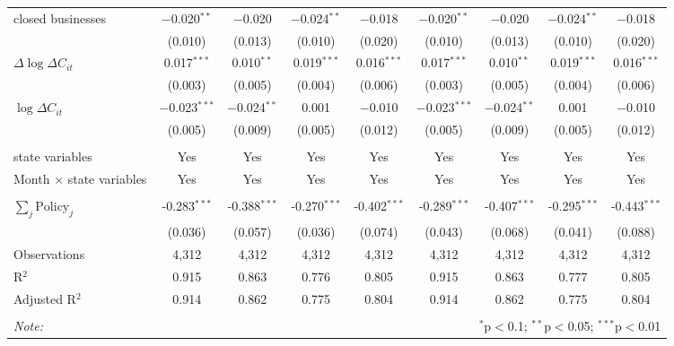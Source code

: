 \begin{tabular}{@{\extracolsep{1pt}}lcccccccc}
  closed businesses & $-$0.020$^{**}$ & $-$0.020 & $-$0.024$^{**}$ & $-$0.018 & $-$0.020$^{**}$ & $-$0.020 & $-$0.024$^{**}$ & $-$0.018 \\ 
  & (0.010) & (0.013) & (0.010) & (0.020) & (0.010) & (0.013) & (0.010) & (0.020) \\ 
  $\Delta \log \Delta C_{it}$ & 0.017$^{***}$ & 0.010$^{**}$ & 0.019$^{***}$ & 0.016$^{***}$ & 0.017$^{***}$ & 0.010$^{**}$ & 0.019$^{***}$ & 0.016$^{***}$ \\ 
  & (0.003) & (0.005) & (0.004) & (0.006) & (0.003) & (0.005) & (0.004) & (0.006) \\ 
  $\log \Delta C_{it}$ & $-$0.023$^{***}$ & $-$0.024$^{**}$ & 0.001 & $-$0.010 & $-$0.023$^{***}$ & $-$0.024$^{**}$ & 0.001 & $-$0.010 \\ 
  & (0.005) & (0.009) & (0.005) & (0.012) & (0.005) & (0.009) & (0.005) & (0.012) \\ 
 \hline \\[-1.8ex] 
state variables & Yes & Yes & Yes & Yes & Yes & Yes & Yes & Yes \\ 
Month $\times$ state variables & Yes & Yes & Yes & Yes & Yes & Yes & Yes & Yes \\ 
\hline \\[-1.8ex] 
$\sum_j \mathrm{Policy}_j$ & -0.283$^{***}$ & -0.388$^{***}$ & -0.270$^{***}$ & -0.402$^{***}$ & -0.289$^{***}$ & -0.407$^{***}$ & -0.295$^{***}$ & -0.443$^{***}$ \\ 
 & (0.036) & (0.057) & (0.036) & (0.074) & (0.043) & (0.068) & (0.041) & (0.088) \\ 
Observations & 4,312 & 4,312 & 4,312 & 4,312 & 4,312 & 4,312 & 4,312 & 4,312 \\ 
R$^{2}$ & 0.915 & 0.863 & 0.776 & 0.805 & 0.915 & 0.863 & 0.777 & 0.805 \\ 
Adjusted R$^{2}$ & 0.914 & 0.862 & 0.775 & 0.804 & 0.914 & 0.862 & 0.775 & 0.804 \\ 
\hline 
\hline \\[-1.8ex] 
\textit{Note:}  & \multicolumn{8}{r}{$^{*}$p$<$0.1; $^{**}$p$<$0.05; $^{***}$p$<$0.01} \\ 
\end{tabular} 